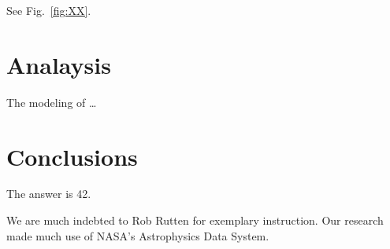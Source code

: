 \documentclass{aa}   %
\begin{document}
See Fig.~\ref{fig:XX}.


\section{Analaysis}    \label{sec:analysis}
The modeling of \dots


\section{Conclusions} \label{sec:conclusions}
The answer is 42.


\begin{acknowledgements}
  We are much indebted to Rob Rutten for exemplary instruction.
  Our research made much use of NASA's Astrophysics Data System.
\end{acknowledgements}


\end{document}
